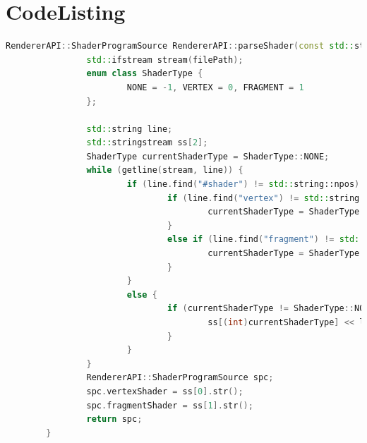 \documentclass[a4paper]{article}
\begin{document}
    \section{CodeListing}
        \begin{lstlisting}[language=C++]
            RendererAPI::ShaderProgramSource RendererAPI::parseShader(const std::string& filePath) {
                std::ifstream stream(filePath);
                enum class ShaderType {
                        NONE = -1, VERTEX = 0, FRAGMENT = 1
                };

                std::string line;
                std::stringstream ss[2];
                ShaderType currentShaderType = ShaderType::NONE;
                while (getline(stream, line)) {
                        if (line.find("#shader") != std::string::npos) {
                                if (line.find("vertex") != std::string::npos) {
                                        currentShaderType = ShaderType::VERTEX;
                                }
                                else if (line.find("fragment") != std::string::npos) {
                                        currentShaderType = ShaderType::FRAGMENT;
                                }
                        }
                        else {
                                if (currentShaderType != ShaderType::NONE) {
                                        ss[(int)currentShaderType] << line << "\n";
                                }
                        }
                }
                RendererAPI::ShaderProgramSource spc;
                spc.vertexShader = ss[0].str();
                spc.fragmentShader = ss[1].str();
                return spc;
        }

        \end{lstlisting}
\end{document}
